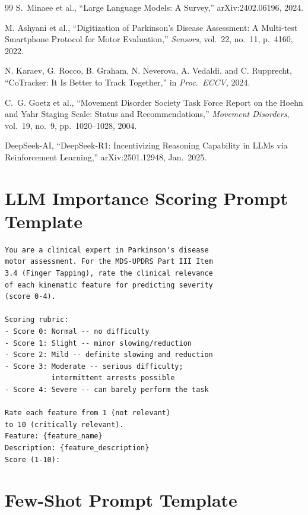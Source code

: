 \documentclass[conference]{IEEEtran}
\begin{document}
\begin{thebibliography}{99}
S.~Minaee et al.,
``Large Language Models: A Survey,''
arXiv:2402.06196, 2024.

M. Ashyani et al.,
``Digitization of Parkinson's Disease Assessment: A Multi-test Smartphone
Protocol for Motor Evaluation,''
\textit{Sensors}, vol.~22, no.~11, p.~4160, 2022.

N. Karaev, G. Rocco, B. Graham, N. Neverova, A. Vedaldi, and C. Rupprecht,
``CoTracker: It Is Better to Track Together,''
in \textit{Proc.\ ECCV}, 2024.

C.~G. Goetz et al.,
``Movement Disorder Society Task Force Report on the Hoehn and Yahr Staging
Scale: Status and Recommendations,''
\textit{Movement Disorders}, vol.~19, no.~9, pp.~1020--1028, 2004.

DeepSeek-AI,
``DeepSeek-R1: Incentivizing Reasoning Capability in LLMs via Reinforcement
Learning,''
arXiv:2501.12948, Jan.\ 2025.

\end{thebibliography}

\iffalse %
\appendices

\section{LLM Importance Scoring Prompt Template}

{\footnotesize
\begin{verbatim}
You are a clinical expert in Parkinson's disease
motor assessment. For the MDS-UPDRS Part III Item
3.4 (Finger Tapping), rate the clinical relevance
of each kinematic feature for predicting severity
(score 0-4).

Scoring rubric:
- Score 0: Normal -- no difficulty
- Score 1: Slight -- minor slowing/reduction
- Score 2: Mild -- definite slowing and reduction
- Score 3: Moderate -- serious difficulty;
           intermittent arrests possible
- Score 4: Severe -- can barely perform the task

Rate each feature from 1 (not relevant)
to 10 (critically relevant).
Feature: {feature_name}
Description: {feature_description}
Score (1-10):
\end{verbatim}
}

\section{Few-Shot Prompt Template}
\end{document}

